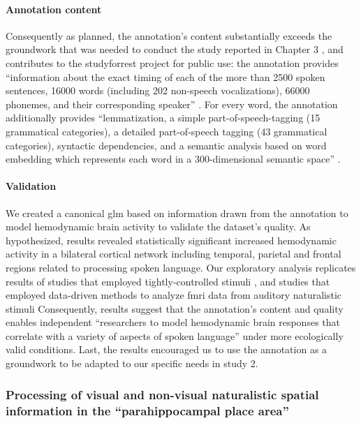 \paragraph{Annotation content}
%
Consequently as planned, the annotation's content substantially exceeds the
groundwork that was needed to conduct the study reported in Chapter 3
\citep[s.][]{haeusler2022processing}, and contributes to the studyforrest
project for public use:
the annotation provides ``information about the exact timing of each of the more
than 2500 spoken sentences, 16000 words (including 202 non-speech
vocalizations), 66000 phonemes, and their corresponding speaker''
\citep{haeusler2021speechanno}.
%
For every word, the annotation additionally provides ``lemmatization, a simple
part-of-speech-tagging (15 grammatical categories), a detailed part-of-speech
tagging (43 grammatical categories), syntactic dependencies, and a semantic
analysis based on word embedding which represents each word in a 300-dimensional
semantic space'' \citep{haeusler2021speechanno}.


\paragraph{Validation}

We created a canonical \ac{glm} based on information drawn from the annotation
to model hemodynamic brain activity to validate the dataset's quality.
As hypothesized, results revealed statistically significant increased
hemodynamic activity in a bilateral cortical network including temporal,
parietal and frontal regions related to processing spoken language.
Our exploratory analysis replicates results of studies that employed
tightly-controlled stimuli \citep[s.][for reviews]{friederici2011brain,
hickok2007cortical,price2012twentyyears}, and studies that employed
data-driven methods to analyze \ac{fmri} data from auditory naturalistic stimuli
\citep{honey2012not, lerner2011topographic, silbert2014coupled}
Consequently, results suggest that the annotation's content and quality enables
independent ``researchers to model hemodynamic brain responses that correlate
with a variety of aspects of spoken language'' \citep{haeusler2021speechanno}
under more ecologically valid conditions.
Last, the results encouraged us to use the annotation as a groundwork to be
adapted to our specific needs in study 2.


\subsubsection{Processing of visual and non-visual naturalistic spatial
information in the ``parahippocampal place area''}

